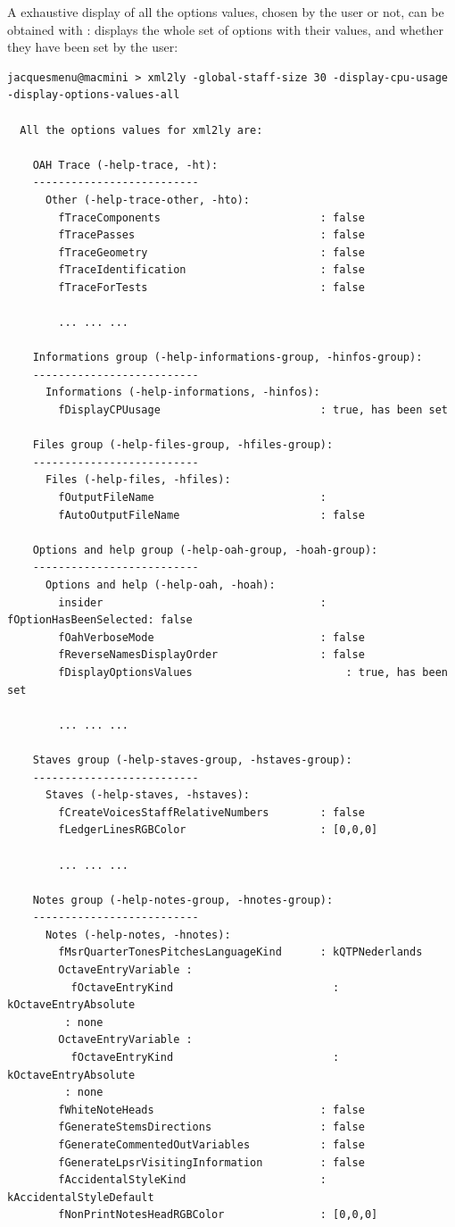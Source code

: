 A exhaustive display of all the options values, chosen by the user or not, can be obtained with :
displays the whole set of options with their values, and whether they have been set by the user:
\begin{lstlisting}[language=Terminal]
jacquesmenu@macmini > xml2ly -global-staff-size 30 -display-cpu-usage -display-options-values-all

  All the options values for xml2ly are:

    OAH Trace (-help-trace, -ht):
    --------------------------
      Other (-help-trace-other, -hto):
        fTraceComponents                         : false
        fTracePasses                             : false
        fTraceGeometry                           : false
        fTraceIdentification                     : false
        fTraceForTests                           : false

		... ... ...

    Informations group (-help-informations-group, -hinfos-group):
    --------------------------
      Informations (-help-informations, -hinfos):
        fDisplayCPUusage                         : true, has been set

    Files group (-help-files-group, -hfiles-group):
    --------------------------
      Files (-help-files, -hfiles):
        fOutputFileName                          :
        fAutoOutputFileName                      : false

    Options and help group (-help-oah-group, -hoah-group):
    --------------------------
      Options and help (-help-oah, -hoah):
        insider                                  : fOptionHasBeenSelected: false
        fOahVerboseMode                          : false
        fReverseNamesDisplayOrder                : false
        fDisplayOptionsValues                        : true, has been set

		... ... ...

    Staves group (-help-staves-group, -hstaves-group):
    --------------------------
      Staves (-help-staves, -hstaves):
        fCreateVoicesStaffRelativeNumbers        : false
        fLedgerLinesRGBColor                     : [0,0,0]

		... ... ...

    Notes group (-help-notes-group, -hnotes-group):
    --------------------------
      Notes (-help-notes, -hnotes):
        fMsrQuarterTonesPitchesLanguageKind      : kQTPNederlands
        OctaveEntryVariable :
          fOctaveEntryKind                         : kOctaveEntryAbsolute
         : none
        OctaveEntryVariable :
          fOctaveEntryKind                         : kOctaveEntryAbsolute
         : none
        fWhiteNoteHeads                          : false
        fGenerateStemsDirections                 : false
        fGenerateCommentedOutVariables           : false
        fGenerateLpsrVisitingInformation         : false
        fAccidentalStyleKind                     : kAccidentalStyleDefault
        fNonPrintNotesHeadRGBColor               : [0,0,0]


\end{lstlisting}
